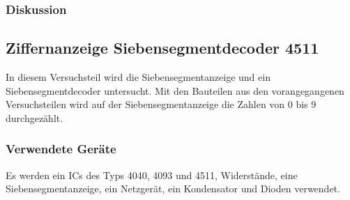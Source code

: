 \documentclass[12pt,a4paper]{article}
\begin{document}
\subsubsection*{Diskussion}



\subsection{Ziffernanzeige Siebensegmentdecoder 4511}

In diesem Versuchsteil wird die Siebensegmentanzeige und ein Siebensegmentdecoder untersucht. Mit den Bauteilen aus den vorangegangenen Versuchsteilen wird auf der Siebensegmentanzeige die Zahlen von 0 bis 9 durchgezählt.

\subsubsection*{Verwendete Geräte}

Es werden ein ICs des Typs 4040, 4093 und 4511, Widerstände, eine Siebensegmentanzeige, ein Netzgerät, ein Kondensator und Dioden verwendet. 
\end{document}
